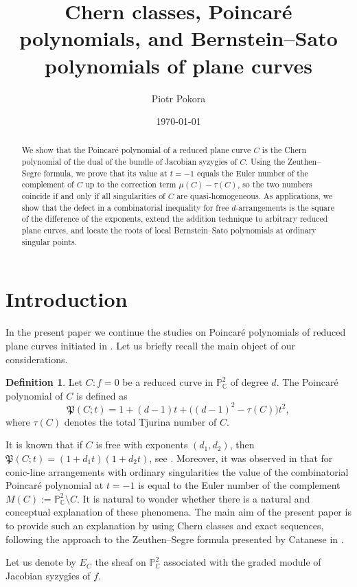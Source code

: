 \documentclass[11pt]{amsart}
\title{Chern classes, Poincar\'e polynomials, and Bernstein--Sato polynomials of plane curves}
\date{\today}
\author{Piotr Pokora}
\theoremstyle{definition}
\newtheorem{definition}[theorem]{Definition}
\numberwithin{equation}{section}
\newcommand{\PP}{\mathbb{P}}
\newcommand{\CC}{\mathbb{C}}
\newcommand{\Pfrak}{\mathfrak{P}}
\newcommand{\gdel}[1]{}
\begin{document}
\begin{abstract}
We show that the Poincar\'e polynomial of a reduced plane curve $C$ is the Chern polynomial
of the dual of the bundle of Jacobian syzygies of $C$. Using the Zeuthen--Segre formula,
we prove that its value at $t=-1$ equals the Euler number of the complement of $C$ up to
the correction term $\mu(C)-\tau(C)$, so the two numbers coincide if and only if all
singularities of $C$ are quasi-homogeneous. As applications, we show that the defect in a
combinatorial inequality for free $d$-arrangements is the square of the difference of the
exponents, extend the addition technique to arbitrary reduced plane curves, and locate the
roots of local Bernstein--Sato polynomials at ordinary singular points. 
\end{abstract}
\maketitle
\section{Introduction}

In the present paper we continue the studies on Poincar\'e polynomials of reduced plane curves initiated in \cite{Di25, Po25, Po24}.
Let us briefly recall the main object of our considerations.

\begin{definition}
Let $C\colon f=0$ be a reduced curve in $\PP^2_\CC$ of degree $d$.
The Poincar\'e polynomial of $C$ is defined as
\[
\Pfrak(C;t)=1+(d-1)t+\bigl((d-1)^2-\tau(C)\bigr)t^2,
\]
where $\tau(C)$ denotes the total Tjurina number of $C$.
\end{definition}

It is known that if $C$ is free with exponents $(d_1,d_2)$, then $\Pfrak(C;t)=(1+d_1t)(1+d_2t)$, see \cite{Di25, Po24}.
Moreover, it was observed in \cite[Remark~3.5]{Po25} that for conic-line arrangements with ordinary \gdel{quasi-homogeneous} singularities the value of the combinatorial Poincar\'e polynomial at $t=-1$ is equal to the Euler number of the complement $M(C):=\PP^2_\CC\setminus C$.
It is natural to wonder whether there is a natural and conceptual explanation of these phenomena.
The main aim of the present paper is to provide such an explanation by using Chern classes and exact sequences, following the approach to the Zeuthen--Segre formula presented by Catanese in \cite[Section~1.3.3]{BCP}.

Let us denote by $E_C$ the sheaf on $\PP^2_\CC$ associated with the graded module of Jacobian syzygies of $f$. 
\end{document}
